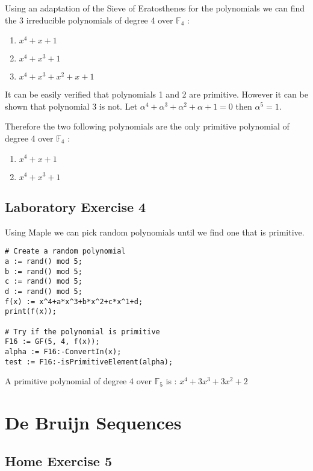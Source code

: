 \documentclass{article}
\begin{document}
Using an adaptation of the Sieve of Eratosthenes for the polynomials we can find the 3 irreducible polynomials of degree 4 over $\mathbb{F}_4$ :
\begin{enumerate}
    \item $x^4+x+1$
    \item $x^4+x^3+1$
    \item $x^4+x^3+x^2+x+1$
\end{enumerate}

It can be easily verified that polynomials 1 and 2 are primitive. However it can be shown that polynomial 3 is not. Let $\alpha^4+\alpha^3+\alpha^2+\alpha+1 = 0$ then $\alpha^5=1$. \newline

Therefore the two following polynomials are the only primitive polynomial of degree 4 over $\mathbb{F}_4$ :
\begin{enumerate}
    \item $x^4+x+1$
    \item $x^4+x^3+1$
\end{enumerate}

\subsection{Laboratory Exercise 4}

Using Maple we can pick random polynomials until we find one that is primitive.
\begin{verbatim}
# Create a random polynomial
a := rand() mod 5;
b := rand() mod 5;
c := rand() mod 5;
d := rand() mod 5;
f(x) := x^4+a*x^3+b*x^2+c*x^1+d;
print(f(x));

# Try if the polynomial is primitive
F16 := GF(5, 4, f(x));
alpha := F16:-ConvertIn(x);	
test := F16:-isPrimitiveElement(alpha);
\end{verbatim}

A primitive polynomial of degree 4 over $\mathbb{F}_5$ is : $x^4+3x^3+3x^2+2$


\section{De Bruijn Sequences}

\subsection{Home Exercise 5}
\end{document}
